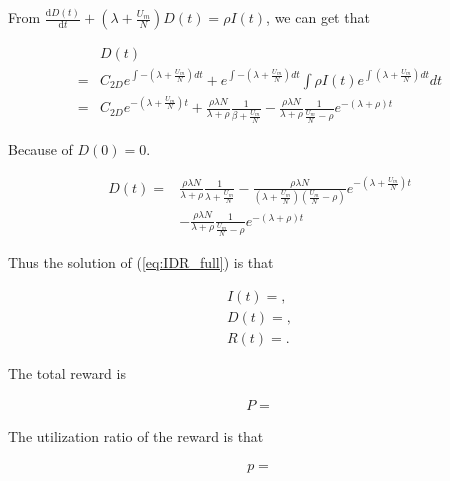 From $\frac{\mathrm{d} D(t)}{\mathrm{d} t} + (\lambda + \frac{U_{m}}{N}) D(t)= \rho I(t)$,
we can get that
\begin{small}
\begin{equation}
\nonumber
\begin{aligned}
& D(t) \\
=& C_{2D} e^{\int -(\lambda + \frac{U_{m}}{N}) dt} 
+ e^{\int -(\lambda + \frac{U_{m}}{N}) dt} \int \rho I(t) e^{\int (\lambda + \frac{U_{m}}{N}) dt} dt \\
=& C_{2D} e^{-(\lambda + \frac{U_{m}}{N})t} + \frac{ \rho \lambda N }{ \lambda + \rho } \frac{1}{\beta + \frac{U_{m}}{N}}
- \frac{ \rho \lambda N }{ \lambda + \rho } \frac{1}{\frac{U_{m}}{N} - \rho} e^{-(\lambda + \rho)t}
\end{aligned}
\end{equation}
\end{small}
Because of $D(0) = 0$.
\begin{small}
\begin{equation}
\nonumber
\begin{aligned}
D(t) =& \frac{ \rho \lambda N }{ \lambda + \rho } \frac{1}{\lambda + \frac{U_{m}}{N}}
- \frac{\rho \lambda N}{(\lambda + \frac{U_{m}}{N})(\frac{U_{m}}{N} - \rho)}  e^{-(\lambda + \frac{U_{m}}{N})t}\\
& - \frac{ \rho \lambda N }{ \lambda + \rho } \frac{1}{\frac{U_{m}}{N} - \rho} e^{-(\lambda + \rho)t}
\end{aligned}
\end{equation}
\end{small}
Thus the solution of (\ref{eq:IDR_full}) is that
\begin{small}
\begin{equation}
\label{eq:IDR_full_solu}
\begin{aligned}
I(t) = ,\\
D(t) = ,\\
R(t) = .
\end{aligned}
\end{equation}
\end{small}

The total reward is
\begin{small}
\begin{equation}
\nonumber
\begin{aligned}
P =
\end{aligned}
\end{equation}
\end{small}

The utilization ratio of the reward is that
\begin{small}
\begin{equation}
\nonumber
\begin{aligned}
p =
\end{aligned}
\end{equation}
\end{small}

